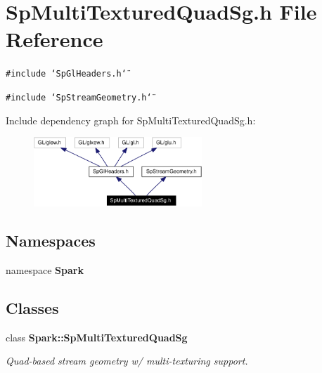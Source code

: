 \section{Sp\-Multi\-Textured\-Quad\-Sg.h File Reference}
\label{SpMultiTexturedQuadSg_8h}
{\tt \#include \char`\"{}Sp\-Gl\-Headers.h\char`\"{}}\par
{\tt \#include \char`\"{}Sp\-Stream\-Geometry.h\char`\"{}}\par


Include dependency graph for Sp\-Multi\-Textured\-Quad\-Sg.h:\begin{figure}[H]
\begin{center}
\leavevmode
\includegraphics[width=179pt]{SpMultiTexturedQuadSg_8h__incl}
\end{center}
\end{figure}
\subsection*{Namespaces}
\begin{CompactItemize}
\item 
namespace {\bf Spark}
\end{CompactItemize}
\subsection*{Classes}
\begin{CompactItemize}
\item 
class {\bf Spark::Sp\-Multi\-Textured\-Quad\-Sg}
\begin{CompactList}\small\item\em Quad-based stream geometry w/ multi-texturing support. \item\end{CompactList}\end{CompactItemize}
